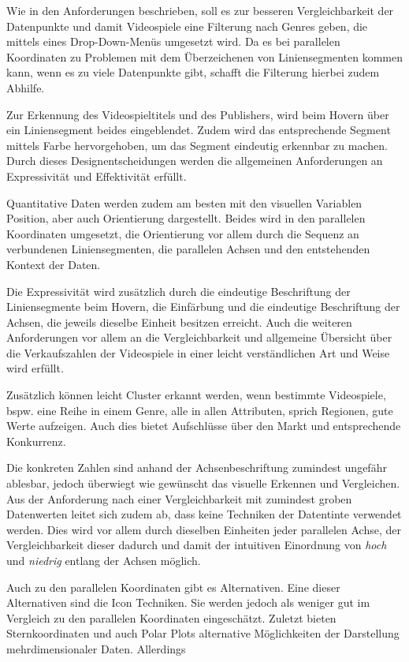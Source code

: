 \documentclass[usegeometry=true]{scrartcl}
\begin{document}
Wie in den Anforderungen beschrieben, soll es zur besseren Vergleichbarkeit der Datenpunkte und damit Videospiele eine Filterung nach Genres geben, die mittels eines Drop-Down-Menüs umgesetzt wird. 
Da es bei parallelen Koordinaten zu Problemen mit dem Überzeichenen von Liniensegmenten kommen kann, wenn es zu viele Datenpunkte gibt, schafft die Filterung hierbei zudem Abhilfe. 

Zur Erkennung des Videospieltitels und des Publishers, wird beim Hovern über ein Liniensegment beides eingeblendet. 
Zudem wird das entsprechende Segment mittels Farbe hervorgehoben, um das Segment eindeutig erkennbar zu machen.
Durch dieses Designentscheidungen werden die allgemeinen Anforderungen an Expressivität und Effektivität erfüllt. 

Quantitative Daten werden zudem am besten mit den visuellen Variablen Position, aber auch Orientierung dargestellt. %
Beides wird in den parallelen Koordinaten umgesetzt, die Orientierung vor allem durch die Sequenz an verbundenen Liniensegmenten, die parallelen Achsen und den entstehenden Kontext der Daten. 

Die Expressivität wird zusätzlich durch die eindeutige Beschriftung der Liniensegmente beim Hovern, die Einfärbung und die eindeutige Beschriftung der Achsen, die jeweils dieselbe Einheit besitzen erreicht. 
Auch die weiteren Anforderungen vor allem an die Vergleichbarkeit und allgemeine Übersicht über die Verkaufszahlen der Videospiele in einer leicht verständlichen Art und Weise wird erfüllt.

Zusätzlich können leicht Cluster erkannt werden, wenn bestimmte Videospiele, bspw. eine Reihe in einem Genre, alle in allen Attributen, sprich Regionen, gute Werte aufzeigen. 
Auch dies bietet Aufschlüsse über den Markt und entsprechende Konkurrenz.

Die konkreten Zahlen sind anhand der Achsenbeschriftung zumindest ungefähr ablesbar, jedoch überwiegt wie gewünscht das visuelle Erkennen und Vergleichen. Aus der Anforderung nach einer Vergleichbarkeit mit zumindest groben Datenwerten leitet sich zudem ab, dass keine Techniken der Datentinte verwendet werden.
Dies wird vor allem durch dieselben Einheiten jeder parallelen Achse, der Vergleichbarkeit dieser dadurch und damit der intuitiven Einordnung von \textit{hoch} und \textit{niedrig} entlang der Achsen möglich.

Auch zu den parallelen Koordinaten gibt es Alternativen. 
Eine dieser Alternativen sind die Icon Techniken. Sie werden jedoch als weniger gut im Vergleich zu den parallelen Koordinaten eingeschätzt.
Zuletzt bieten Sternkoordinaten und auch Polar Plots alternative Möglichkeiten der Darstellung mehrdimensionaler Daten. Allerdings
\end{document}
